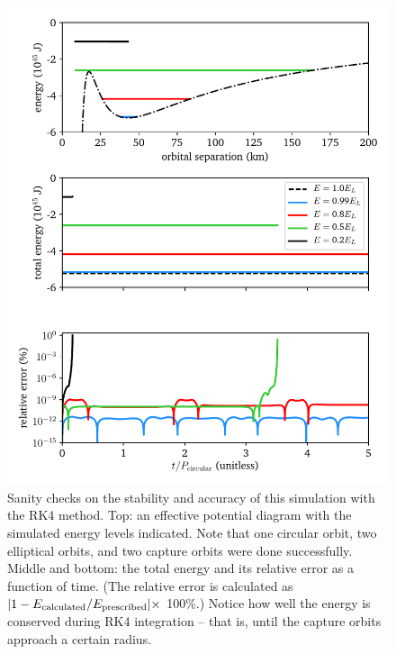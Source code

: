 \documentclass[11pt]{article}
\begin{document}
\begin{enumerate}
\begin{figure}
\includegraphics{relativistic_orbit/relativistic_sanity_checks.pdf}
\caption{\label{fig:orbit_checks} Sanity checks on the stability and accuracy of this simulation with the RK4 method. Top: an effective potential diagram with the simulated energy levels indicated. Note that one circular orbit, two elliptical orbits, and two capture orbits were done successfully. Middle and bottom: the total energy and its relative error as a function of time. (The relative error is calculated as $\vert 1 - E_{\rm calculated}/E_{\rm prescribed} \vert \times$ 100\%.) Notice how well the energy is conserved during RK4 integration -- that is, until the capture orbits approach a certain radius.}
\end{figure}
\begin{figure}
\centering

\end{figure}
\end{enumerate}
\end{document}

